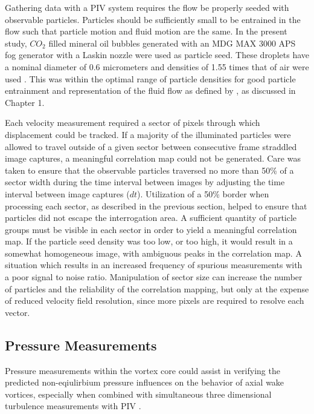 Gathering data with a PIV system requires the flow be properly seeded with 
observable particles. Particles should be sufficiently small to be entrained in 
the flow such that particle motion and fluid motion are the same. In the 
present study, $CO_2$ filled mineral oil bubbles generated with an MDG MAX 3000 
APS fog generator with a Laskin nozzle were used as particle seed. These 
droplets have a nominal diameter of 0.6 micrometers and densities of 1.55 times 
that of air were used \cite{mdgfog}. This was within the optimal range of 
particle densities for good particle entrainment and representation of the 
fluid flow as defined by \cite{mei1996}, as discussed in Chapter 1.

Each velocity measurement 
required a sector of pixels through which displacement could be tracked. If 
a majority of the illuminated particles were allowed to travel outside of a 
given sector between consecutive frame straddled image captures, a meaningful 
correlation map could not be generated. Care was taken to ensure that the 
observable particles 
traversed no more than 50\% of a sector width during the time interval between 
images by adjusting the time interval between image captures ($dt$). 
Utilization of a 50\% border when processing each sector, as described in the 
previous section, helped to ensure that particles did not escape the 
interrogation area. A sufficient quantity of particle groups must be visible in 
each sector in order to yield a meaningful correlation map. If the particle 
seed density was too low, or too high, it would result in a somewhat 
homogeneous image, with ambiguous peaks in the correlation map. A situation 
which results in an increased frequency of spurious measurements with a 
poor signal to noise ratio. Manipulation of sector size 
can increase the number of particles and the reliability of the correlation 
mapping, but only at the expense of reduced velocity field resolution, since 
more pixels are required to resolve each vector.


\subsection{Pressure Measurements}

Pressure measurements within the vortex core could assist in verifying the 
predicted non-eqiulirbium pressure influences on the behavior of axial wake 
vortices, especially when combined with simultaneous three dimensional 
turbulence measurements with PIV \cite{ash2011}.


